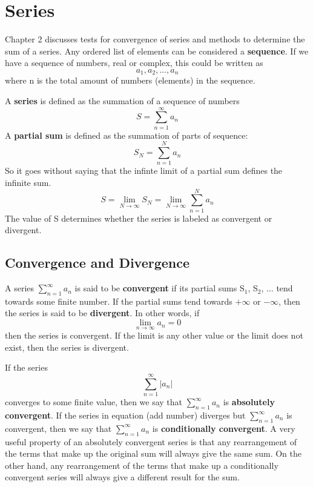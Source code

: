 \documentclass{article}
\newcommand{\be}{\begin{equation}}
\newcommand{\ee}{\end{equation}}
\begin{document}
\section*{Series}
Chapter 2 discusses tests for convergence of series and methods to determine the sum of a series.
Any ordered list of elements can be considered a \textbf{sequence}.
If we have a sequence of numbers, real or complex, this could be written as
\be
  a_1, a_2, \hdots, a_n
\ee
where n is the total amount of numbers (elements) in the sequence.

A \textbf{series} is defined as the summation of a sequence of numbers
\be
S=\sum_{n=1}^{\infty} a_n
\ee
A \textbf{partial sum} is defined as the summation of parts of sequence:
\be
S_N = \sum_{n=1}^{N} a_n
\ee
So it goes without saying that the infinte limit of a partial sum defines the infinite sum.
\be
S = \lim_{N \to \infty}{S_N} = \lim_{N \to \infty} \sum_{n=1}^{N} a_n
\ee
The value of S determines whether the series is labeled as convergent or divergent.
\subsection*{Convergence and Divergence}
A series $\sum\limits_{n=1}^{\infty} a_n$ is said to be \textbf{convergent} if its partial sums S$_1$, S$_2$, $\hdots$ tend towards some finite number.
If the partial sums tend towards $+\infty$ or $-\infty$, then the series is said to be \textbf{divergent}.
In other words, if
\be
\lim_{n \to \infty}{a_n} = 0
\ee
then the series is convergent.
If the limit is any other value or the limit does not exist, then the series is divergent.

If the series
\be
\sum_{n=1}^{\infty} |a_n|
\ee
converges to some finite value, then we say that $\sum\limits_{n=1}^{\infty} a_n$ is \textbf{absolutely convergent}.
If the series in equation (add number) diverges but $\sum\limits_{n=1}^{\infty} a_n$ is convergent, then we say that $\sum\limits_{n=1}^{\infty} a_n$ is \textbf{conditionally convergent}.
A very useful property of an absolutely convergent series is that any rearrangement of the terms that make up the original sum will always give the same sum.
On the other hand, any rearrangement of the terms that make up a conditionally convergent series will always give a different result for the sum.
\end{document}
